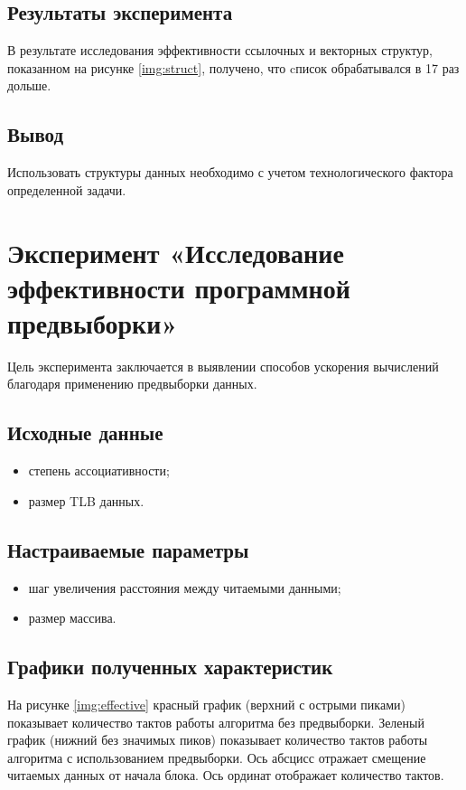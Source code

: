 \section{Результаты эксперимента}

В результате исследования эффективности ссылочных и векторных структур, показанном на рисунке \ref{img:struct}, получено, что cписок обрабатывался в 17 раз дольше.

\section{Вывод}

Использовать структуры данных необходимо с учетом технологического фактора определенной задачи.

\chapter{Эксперимент «Исследование эффективности программной предвыборки»}

Цель эксперимента заключается в выявлении способов ускорения
вычислений благодаря применению предвыборки данных.

\section{Исходные данные}

\begin{itemize}
	\item степень ассоциативности;
	\item размер TLB данных.
\end{itemize}

\section{Настраиваемые параметры}

\begin{itemize}
	\item шаг увеличения расстояния между читаемыми данными;
	\item размер массива.
\end{itemize}

\section{Графики полученных характеристик}

На рисунке \ref{img:effective} красный график (верхний с острыми пиками) показывает количество тактов работы алгоритма без предвыборки. Зеленый график (нижний без значимых пиков) показывает количество тактов работы алгоритма с использованием
предвыборки. Ось абсцисс отражает смещение читаемых данных от начала блока. Ось ординат отображает количество тактов.

